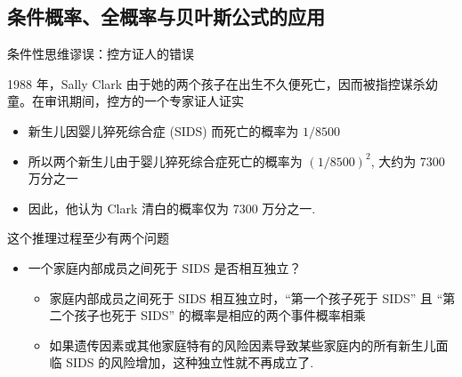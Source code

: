 \subsection{条件概率、全概率与贝叶斯公式的应用}
\begin{frame}{条件性思维谬误：控方证人的错误}
\begin{exam} 1988 年，Sally Clark 由于她的两个孩子在出生不久便死亡，因而被指控谋杀幼童。在审讯期间，控方的一个专家证人证实
\begin{itemize}[<+-|alert@+>]
\item 新生儿因婴儿猝死综合症 (SIDS) 而死亡的概率为 $1/8500$
\item 所以两个新生儿由于婴儿猝死综合症死亡的概率为 $(1/8500)^2$, 大约为 7300 万分之一
\item 因此，他认为 Clark 清白的概率仅为 7300 万分之一.
\end{itemize}
\end{exam}
\vspace{0.2cm}

\pause
\begin{jieda} 这个推理过程至少有两个问题
\begin{itemize}[<+-|alert@+>]
\item 一个家庭内部成员之间死于 SIDS 是否相互独立？
\begin{itemize}[<+-|alert@+>]
\item 家庭内部成员之间死于 SIDS 相互独立时，“第一个孩子死于 SIDS” 且 “第二个孩子也死于 SIDS” 的概率是相应的两个事件概率相乘
\item 如果遗传因素或其他家庭特有的风险因素导致某些家庭内的所有新生儿面临 SIDS 的风险增加，这种独立性就不再成立了.
\end{itemize}
\end{itemize}
\end{jieda}
\end{frame}

